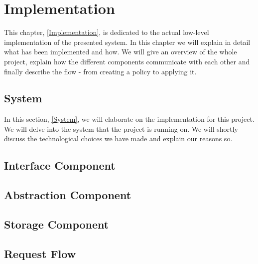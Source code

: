 \section{Implementation}
This chapter, \ref{Implementation}, is dedicated to the actual low-level implementation of the presented system. In this chapter we will explain in detail what has been implemented and how. We will give an overview of the whole project, explain how the different components communicate with each other and finally describe the flow - from creating a policy to applying it. 

\subsection{System}
In this section, \ref{System}, we will elaborate on the implementation for this project. We will delve into the system that the project is running on. We will shortly discuss the technological choices we have made and explain our reasons so.



\subsection{Interface Component}

\subsection{Abstraction Component}

\subsection{Storage Component}

\subsection{Request Flow}